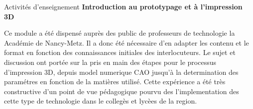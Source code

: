 \begin{rubric}{Activités d'enseignement}
\entry*[]\textbf{Introduction au prototypage et à l’impression 3D}

Ce module a été dispensé auprès des public de professeurs de technologie la Académie de Nancy-Metz. Il a donc été nécessaire d'en adapter les contenu et le format en fonction des connaissances initiales des interlocuteurs. 
Le sujet et discussion ont portée sur la pris en main des étapes pour le processus d'impression 3D, depuis model numerique CAO jusqu'à la determination des paramétres en fonction de la matières utilisé.
Cette expérience a été très constructive d'un point de vue pédagogique pourvu des l'implementation des cette type de technologie dans le collegès et lycèes de la region. 

\end{rubric}

